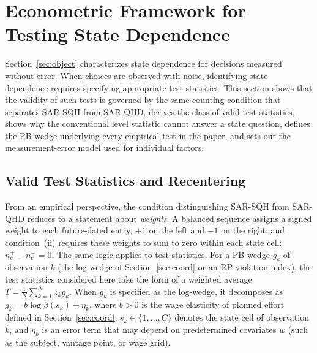 \documentclass[11pt,a4paper]{article}
\theoremstyle{plain}
\theoremstyle{definition}
\begin{document}
\section{Econometric Framework for Testing State Dependence}
\label{sec:stat}


Section~\ref{sec:object} characterizes state dependence for decisions measured without error. When choices are observed with noise, identifying state dependence requires specifying appropriate test statistics. This section shows that the validity of such tests is governed by the same counting condition that separates SAR-SQH from SAR-QHD, derives the class of valid test statistics, shows why the conventional level statistic cannot answer a state question, defines the PB wedge underlying every empirical test in the paper, and sets out the measurement-error model used for individual factors.


\subsection{Valid Test Statistics and Recentering}
\label{sec:balance}


From an empirical perspective, the condition distinguishing SAR-SQH from SAR-QHD reduces to a statement about \emph{weights}. A balanced sequence assigns a signed weight to each future-dated entry, $+1$ on the left and $-1$ on the right, and condition~(ii) requires these weights to sum to zero within each state cell: $n^+_c-n^-_c=0$. 
The same logic applies to test statistics.
For a PB wedge $g_k$ of observation $k$ (the log-wedge of Section~\ref{sec:coord} or an RP violation index), the test statistics considered here take the form of a weighted average $T=\frac{1}{N}\sum_{k=1}^{N}z_k g_k$. 
When $g_k$ is specified as the log-wedge, it decomposes as $g_k = b \log \beta(s_k) + \eta_k$, where $b>0$ is the wage elasticity of planned effort defined in Section~\ref{sec:coord}, $s_k \in \{1,\dots,C\}$ denotes the state cell of observation $k$, and $\eta_k$ is an error term that may depend on predetermined covariates $w$ (such as the subject, vantage point, or wage grid). %
\end{document}
